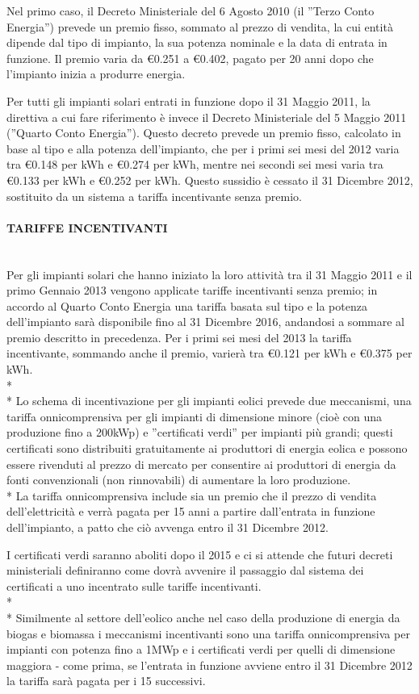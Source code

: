 \documentclass[12pt,a4paper,openright,twoside]{report}
\newcommand{\myparagraph}[1]{\paragraph{#1}\mbox{}\\}
\begin{document}
Nel primo caso, il Decreto Ministeriale del 6 Agosto 2010 (il ''Terzo Conto Energia'') prevede un premio fisso, sommato al prezzo di vendita, la cui entità dipende dal tipo di impianto, la sua potenza nominale e la data di entrata in funzione. Il premio varia da \euro0.251 a \euro0.402, pagato per 20 anni dopo che l'impianto inizia a produrre energia.

Per tutti gli impianti solari entrati in funzione dopo il 31 Maggio 2011, la direttiva a cui fare riferimento è invece il Decreto Ministeriale del 5 Maggio 2011 (''Quarto Conto Energia''). Questo decreto prevede un premio fisso, calcolato in base al tipo e alla potenza dell'impianto, che per i primi sei mesi del 2012 varia tra \euro0.148 per kWh e \euro0.274 per kWh, mentre nei secondi sei mesi varia tra \euro0.133 per kWh e \euro0.252 per kWh. Questo sussidio è cessato il 31 Dicembre 2012, sostituito da un sistema a tariffa incentivante senza premio.

\myparagraph{TARIFFE INCENTIVANTI}
Per gli impianti solari che hanno iniziato la loro attività tra il 31 Maggio 2011 e il primo Gennaio 2013 vengono applicate tariffe incentivanti senza premio; in accordo al Quarto Conto Energia una tariffa basata sul tipo e la potenza dell'impianto sarà disponibile fino al 31 Dicembre 2016, andandosi a sommare al premio descritto in precedenza. Per i primi sei mesi del 2013 la tariffa incentivante, sommando anche il premio, varierà tra \euro0.121 per kWh e \euro0.375 per kWh.
\\*\\*
Lo schema di incentivazione per gli impianti eolici prevede due meccanismi, una tariffa onnicomprensiva per gli impianti di dimensione minore (cioè con una produzione fino a 200kWp) e ''certificati verdi'' per impianti più grandi; questi certificati sono distribuiti gratuitamente ai produttori di energia eolica e possono essere rivenduti al prezzo di mercato per consentire ai produttori di energia da fonti convenzionali (non rinnovabili) di aumentare la loro produzione.\\* La tariffa onnicomprensiva include sia un premio che il prezzo di vendita dell'elettricità e verrà pagata per 15 anni a partire dall'entrata in funzione dell'impianto, a patto che ciò avvenga entro il 31 Dicembre 2012.

I certificati verdi saranno aboliti dopo il 2015 e ci si attende che futuri decreti ministeriali definiranno come dovrà avvenire il passaggio dal sistema dei certificati a uno incentrato sulle tariffe incentivanti.
\\*\\* 
Similmente al settore dell'eolico anche nel caso della produzione di energia da biogas e biomassa i meccanismi incentivanti sono una tariffa onnicomprensiva per impianti con potenza fino a 1MWp e i certificati verdi per quelli di dimensione maggiora - come prima, se l'entrata in funzione avviene entro il 31 Dicembre 2012 la tariffa sarà pagata per i 15 successivi.
\end{document}
